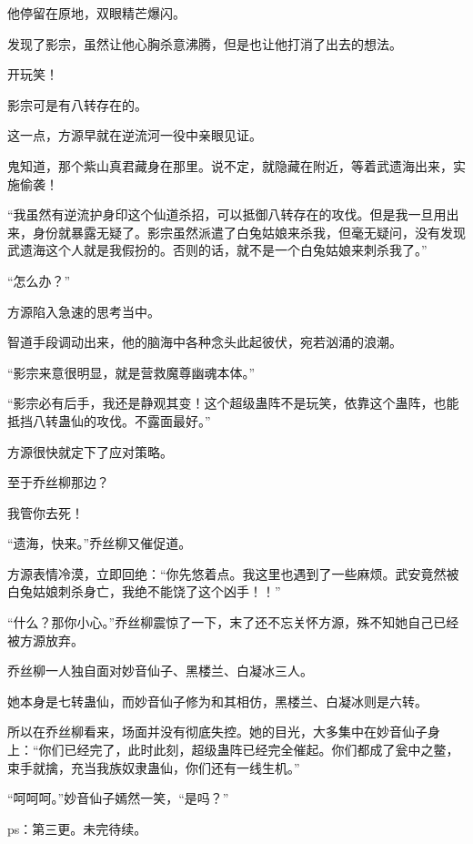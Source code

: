 \begin{this_body}
他停留在原地，双眼精芒爆闪。

发现了影宗，虽然让他心胸杀意沸腾，但是也让他打消了出去的想法。

开玩笑！

影宗可是有八转存在的。

这一点，方源早就在逆流河一役中亲眼见证。

鬼知道，那个紫山真君藏身在那里。说不定，就隐藏在附近，等着武遗海出来，实施偷袭！

“我虽然有逆流护身印这个仙道杀招，可以抵御八转存在的攻伐。但是我一旦用出来，身份就暴露无疑了。影宗虽然派遣了白兔姑娘来杀我，但毫无疑问，没有发现武遗海这个人就是我假扮的。否则的话，就不是一个白兔姑娘来刺杀我了。”

“怎么办？”

方源陷入急速的思考当中。

智道手段调动出来，他的脑海中各种念头此起彼伏，宛若汹涌的浪潮。

“影宗来意很明显，就是营救魔尊幽魂本体。”

“影宗必有后手，我还是静观其变！这个超级蛊阵不是玩笑，依靠这个蛊阵，也能抵挡八转蛊仙的攻伐。不露面最好。”

方源很快就定下了应对策略。

至于乔丝柳那边？

我管你去死！

“遗海，快来。”乔丝柳又催促道。

方源表情冷漠，立即回绝：“你先悠着点。我这里也遇到了一些麻烦。武安竟然被白兔姑娘刺杀身亡，我绝不能饶了这个凶手！！”

“什么？那你小心。”乔丝柳震惊了一下，末了还不忘关怀方源，殊不知她自己已经被方源放弃。

乔丝柳一人独自面对妙音仙子、黑楼兰、白凝冰三人。

她本身是七转蛊仙，而妙音仙子修为和其相仿，黑楼兰、白凝冰则是六转。

所以在乔丝柳看来，场面并没有彻底失控。她的目光，大多集中在妙音仙子身上：“你们已经完了，此时此刻，超级蛊阵已经完全催起。你们都成了瓮中之鳖，束手就擒，充当我族奴隶蛊仙，你们还有一线生机。”

“呵呵呵。”妙音仙子嫣然一笑，“是吗？”

ps：第三更。未完待续。

\end{this_body}

